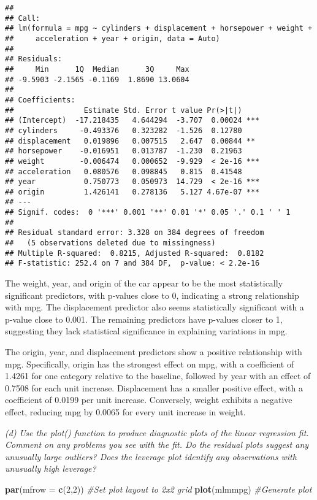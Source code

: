 \documentclass[
]{article}
\newenvironment{Shaded}{\begin{snugshade}}{\end{snugshade}}
\newcommand{\AttributeTok}[1]{\textcolor[rgb]{0.13,0.29,0.53}{#1}}
\newcommand{\CommentTok}[1]{\textcolor[rgb]{0.56,0.35,0.01}{\textit{#1}}}
\newcommand{\DecValTok}[1]{\textcolor[rgb]{0.00,0.00,0.81}{#1}}
\newcommand{\FunctionTok}[1]{\textcolor[rgb]{0.13,0.29,0.53}{\textbf{#1}}}
\newcommand{\NormalTok}[1]{#1}
\begin{document}
\begin{verbatim}
## 
## Call:
## lm(formula = mpg ~ cylinders + displacement + horsepower + weight + 
##     acceleration + year + origin, data = Auto)
## 
## Residuals:
##     Min      1Q  Median      3Q     Max 
## -9.5903 -2.1565 -0.1169  1.8690 13.0604 
## 
## Coefficients:
##                Estimate Std. Error t value Pr(>|t|)    
## (Intercept)  -17.218435   4.644294  -3.707  0.00024 ***
## cylinders     -0.493376   0.323282  -1.526  0.12780    
## displacement   0.019896   0.007515   2.647  0.00844 ** 
## horsepower    -0.016951   0.013787  -1.230  0.21963    
## weight        -0.006474   0.000652  -9.929  < 2e-16 ***
## acceleration   0.080576   0.098845   0.815  0.41548    
## year           0.750773   0.050973  14.729  < 2e-16 ***
## origin         1.426141   0.278136   5.127 4.67e-07 ***
## ---
## Signif. codes:  0 '***' 0.001 '**' 0.01 '*' 0.05 '.' 0.1 ' ' 1
## 
## Residual standard error: 3.328 on 384 degrees of freedom
##   (5 observations deleted due to missingness)
## Multiple R-squared:  0.8215, Adjusted R-squared:  0.8182 
## F-statistic: 252.4 on 7 and 384 DF,  p-value: < 2.2e-16
\end{verbatim}

The weight, year, and origin of the car appear to be the most
statistically significant predictors, with p-values close to 0,
indicating a strong relationship with mpg. The displacement predictor
also seems statistically significant with a p-value close to 0.001. The
remaining predictors have p-values closer to 1, suggesting they lack
statistical significance in explaining variations in mpg.

The origin, year, and displacement predictors show a positive
relationship with mpg. Specifically, origin has the strongest effect on
mpg, with a coefficient of 1.4261 for one category relative to the
baseline, followed by year with an effect of 0.7508 for each unit
increase. Displacement has a smaller positive effect, with a coefficient
of 0.0199 per unit increase. Conversely, weight exhibits a negative
effect, reducing mpg by 0.0065 for every unit increase in weight.

\emph{(d) Use the plot() function to produce diagnostic plots of the
linear regression fit. Comment on any problems you see with the fit. Do
the residual plots suggest any unusually large outliers? Does the
leverage plot identify any observations with unusually high leverage?}

\begin{Shaded}
\begin{Highlighting}[]
\FunctionTok{par}\NormalTok{(}\AttributeTok{mfrow =} \FunctionTok{c}\NormalTok{(}\DecValTok{2}\NormalTok{,}\DecValTok{2}\NormalTok{)) }\CommentTok{\#Set plot layout to 2x2 grid}
\FunctionTok{plot}\NormalTok{(mlmmpg) }\CommentTok{\#Generate plot}
\end{Highlighting}
\end{Shaded}
\end{document}
